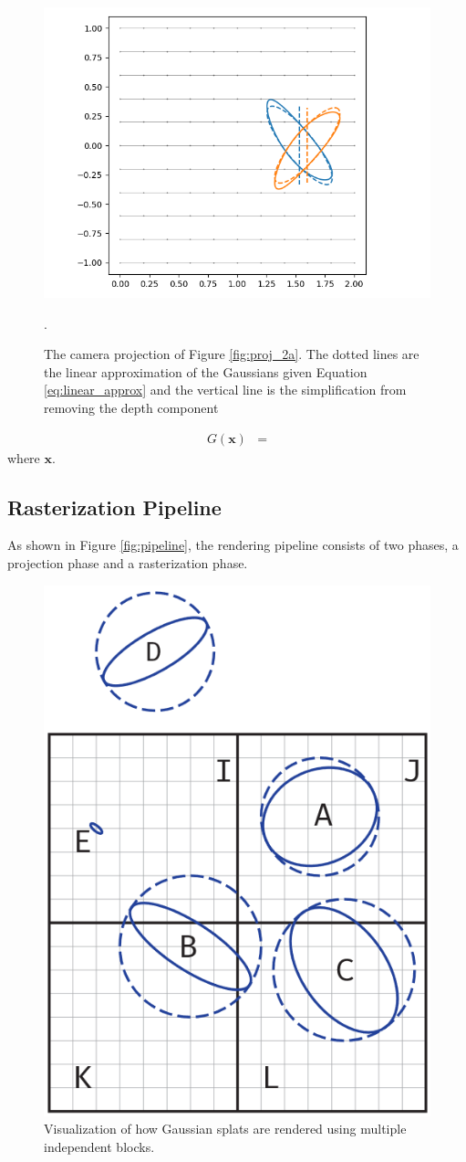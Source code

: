 \begin{figure}[htb]
    \centering
    \includegraphics[width=\linewidth]{images/projb.png}
    \caption{The camera projection of Figure \ref{fig:proj_2a}. The dotted lines are the linear approximation of the Gaussians given Equation \ref{eq:linear_approx} and the vertical line is the simplification from removing the depth component}.
    \label{fig:proj_2b}
\end{figure}

\begin{align}
    G(\bm{x}) & =  \label{eq:gaussian_density_function}
\end{align}
where $\bm{x}$.


\subsection{Rasterization Pipeline}
As shown in Figure \ref{fig:pipeline}, the rendering pipeline consists of two phases, a projection phase and a rasterization phase.

\label{sec:rasterization}
\begin{figure}
    \centering
    \includegraphics[width=0.6\linewidth]{images/rendering.png}
    \caption{Visualization of how Gaussian splats are rendered using multiple independent blocks.}
\end{figure}

